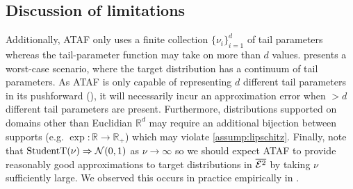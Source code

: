 \documentclass[twoside]{article}
\theoremstyle{definition}
\theoremstyle{remark}
\newtheorem{remark}[theorem]{Remark}
\begin{document}



\vspace{-2mm}
\subsection{Discussion of limitations}
\label{ssec:limitations}

\vspace{-1mm}

Additionally, ATAF only uses a finite collection $\{\nu_i\}_{i=1}^d$ of tail parameters
whereas the tail-parameter function may take on more than $d$ values. 
presents a worst-case scenario, where the target distribution has a continuum of tail parameters.
As ATAF is only capable of representing $d$ different tail parameters in its pushforward
(), it will necessarily incur an approximation error when $> d$ different
tail parameters are present.
Furthermore, distributions supported on domains other than Euclidian $\mathbb{R}^d$ may require an additional bijection between supports (e.g. $\exp : \mathbb{R} \to \mathbb{R}_+$) which
may violate \cref{assump:lipschitz}.
Finally, note that $\text{StudentT}(\nu) \Rightarrow \mathcal{N}(0,1)$ 
as $\nu \to \infty$ so we should expect ATAF to provide reasonably good approximations to target 
distributions in $\overline{\mathcal{E}^2}$ by taking $\nu$ sufficiently large. We observed this occurs in 
practice empirically in .
\end{document}

